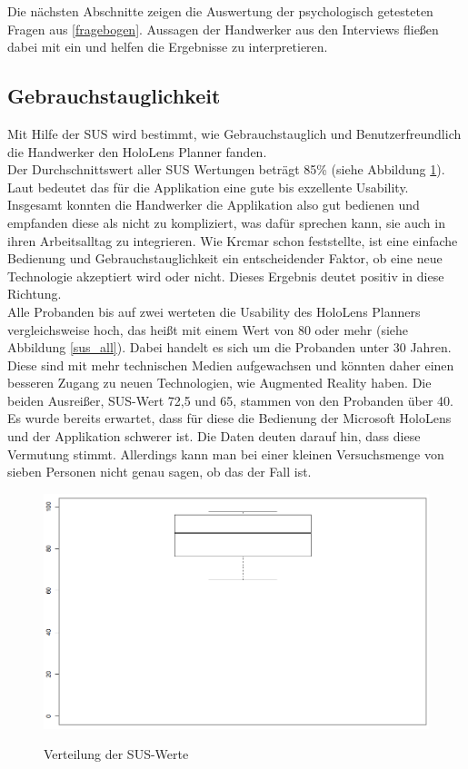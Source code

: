 Die nächsten Abschnitte zeigen die Auswertung der psychologisch getesteten Fragen aus \ref{fragebogen}. Aussagen der Handwerker aus den Interviews fließen dabei mit ein und helfen die Ergebnisse zu interpretieren.

\subsection{Gebrauchstauglichkeit}

Mit Hilfe der SUS wird bestimmt, wie Gebrauchstauglich und Benutzerfreundlich die Handwerker den HoloLens Planner fanden. \\
Der Durchschnittswert aller SUS Wertungen beträgt 85\% (siehe Abbildung \ref{sus_allBox}). Laut \cite{TODO:WebsitevonKai} bedeutet das für die Applikation eine gute bis exzellente Usability. Insgesamt konnten die Handwerker die Applikation also gut bedienen und empfanden diese als nicht zu kompliziert, was dafür sprechen kann, sie auch in ihren Arbeitsalltag zu integrieren. Wie Krcmar \cite{hateful_six_krcmar} schon feststellte, ist eine einfache Bedienung und Gebrauchstauglichkeit ein entscheidender Faktor, ob eine neue Technologie akzeptiert wird oder nicht. Dieses Ergebnis deutet positiv in diese Richtung. \\
Alle Probanden bis auf zwei werteten die Usability des HoloLens Planners vergleichsweise hoch, das heißt mit einem Wert von 80 oder mehr (siehe Abbildung \ref{sus_all}). Dabei handelt es sich um die Probanden unter 30 Jahren. Diese sind mit mehr technischen Medien aufgewachsen und könnten daher einen besseren Zugang zu neuen Technologien, wie Augmented Reality haben. Die beiden Ausreißer, SUS-Wert 72,5 und 65, stammen von den Probanden über 40. Es wurde bereits erwartet, dass für diese die Bedienung der Microsoft HoloLens und der Applikation schwerer ist. Die Daten deuten darauf hin, dass diese Vermutung stimmt. Allerdings kann man bei einer kleinen Versuchsmenge von sieben Personen nicht genau sagen, ob das der Fall ist. 

\begin{figure}[h]
	\begin{center}
		\includegraphics[scale=0.5]{Resources/Evaluation/sus_totalBox.png}
		\label{sus_allBox}
		\caption{Verteilung der SUS-Werte}	
	\end{center}
\end{figure}

